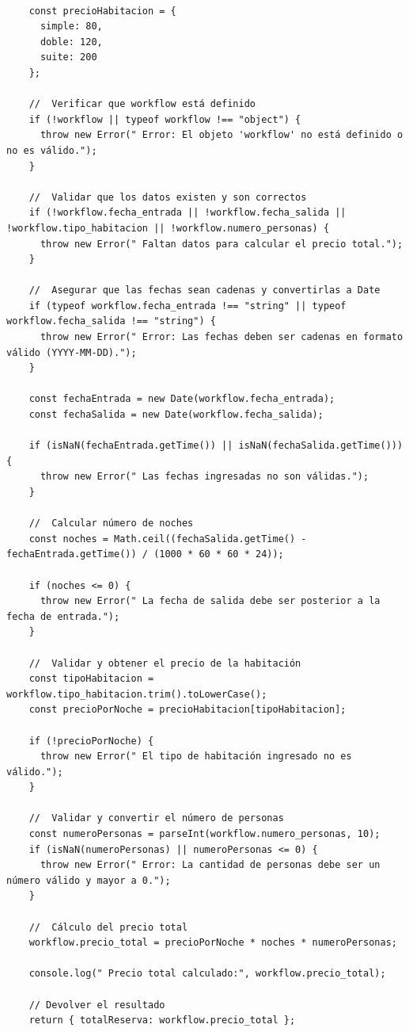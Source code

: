 \documentclass[12pt]{article}
\begin{document}
\begin{verbatim}

    const precioHabitacion = {
      simple: 80,
      doble: 120,
      suite: 200
    };
    
    //  Verificar que workflow está definido
    if (!workflow || typeof workflow !== "object") {
      throw new Error(" Error: El objeto 'workflow' no está definido o no es válido.");
    }
    
    //  Validar que los datos existen y son correctos
    if (!workflow.fecha_entrada || !workflow.fecha_salida || !workflow.tipo_habitacion || !workflow.numero_personas) {
      throw new Error(" Faltan datos para calcular el precio total.");
    }
    
    //  Asegurar que las fechas sean cadenas y convertirlas a Date
    if (typeof workflow.fecha_entrada !== "string" || typeof workflow.fecha_salida !== "string") {
      throw new Error(" Error: Las fechas deben ser cadenas en formato válido (YYYY-MM-DD).");
    }
    
    const fechaEntrada = new Date(workflow.fecha_entrada);
    const fechaSalida = new Date(workflow.fecha_salida);
    
    if (isNaN(fechaEntrada.getTime()) || isNaN(fechaSalida.getTime())) {
      throw new Error(" Las fechas ingresadas no son válidas.");
    }
    
    //  Calcular número de noches
    const noches = Math.ceil((fechaSalida.getTime() - fechaEntrada.getTime()) / (1000 * 60 * 60 * 24));
    
    if (noches <= 0) {
      throw new Error(" La fecha de salida debe ser posterior a la fecha de entrada.");
    }
    
    //  Validar y obtener el precio de la habitación
    const tipoHabitacion = workflow.tipo_habitacion.trim().toLowerCase();
    const precioPorNoche = precioHabitacion[tipoHabitacion];
    
    if (!precioPorNoche) {
      throw new Error(" El tipo de habitación ingresado no es válido.");
    }
    
    //  Validar y convertir el número de personas
    const numeroPersonas = parseInt(workflow.numero_personas, 10);
    if (isNaN(numeroPersonas) || numeroPersonas <= 0) {
      throw new Error(" Error: La cantidad de personas debe ser un número válido y mayor a 0.");
    }
    
    //  Cálculo del precio total
    workflow.precio_total = precioPorNoche * noches * numeroPersonas;
    
    console.log(" Precio total calculado:", workflow.precio_total);
    
    // Devolver el resultado
    return { totalReserva: workflow.precio_total };

\end{verbatim}
\end{document}
